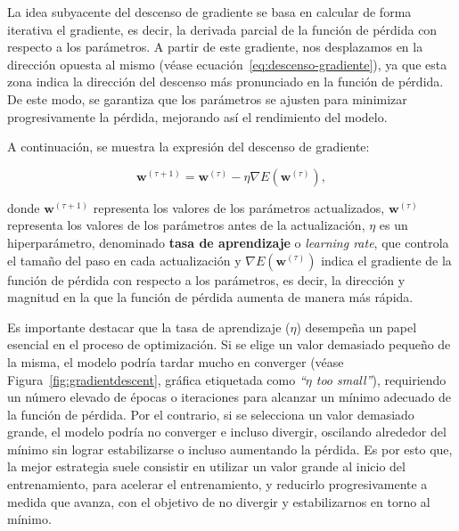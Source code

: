 La idea subyacente del descenso de gradiente se basa en calcular de forma iterativa el gradiente, es decir, la derivada parcial de la función de pérdida con respecto a los parámetros. A partir de este gradiente, nos desplazamos en la dirección opuesta al mismo (véase ecuación~\eqref{eq:descenso-gradiente}), ya que esta zona indica la dirección del descenso más pronunciado en la función de pérdida. De este modo, se garantiza que los parámetros se ajusten para minimizar progresivamente la pérdida, mejorando así el rendimiento del modelo.

A continuación, se muestra la expresión del descenso de gradiente:

\begin{equation}
    \mathbf{w}^{(\tau + 1)} = \mathbf{w}^{(\tau)} - \eta \nabla E(\mathbf{w}^{(\tau)}),
    \label{eq:descenso-gradiente}
\end{equation}

donde $\mathbf{w}^{(\tau + 1)}$ representa los valores de los parámetros actualizados, $\mathbf{w}^{(\tau)}$ representa los valores de los parámetros antes de la actualización, $\eta$ es un hiperparámetro, denominado \textbf{tasa de aprendizaje} o \emph{learning rate}, que controla el tamaño del paso en cada actualización y $\nabla E(\mathbf{w}^{(\tau)})$ indica el gradiente de la función de pérdida con respecto a los parámetros, es decir, la dirección y magnitud en la que la función de pérdida aumenta de manera más rápida.

Es importante destacar que la tasa de aprendizaje ($\eta$) desempeña un papel esencial en el proceso de optimización. Si se elige un valor demasiado pequeño de la misma, el modelo podría tardar mucho en converger (véase Figura~\ref{fig:gradientdescent}, gráfica etiquetada como \textit{``$\eta$ too small''}), requiriendo un número elevado de épocas o iteraciones para alcanzar un mínimo adecuado de la función de pérdida. Por el contrario, si se selecciona un valor demasiado grande, el modelo podría no converger e incluso divergir, oscilando alrededor del mínimo sin lograr estabilizarse o incluso aumentando la pérdida. Es por esto que, la mejor estrategia suele consistir en utilizar un valor grande al inicio del entrenamiento, para acelerar el entrenamiento, y reducirlo progresivamente a medida que avanza, con el objetivo de no divergir y estabilizarnos en torno al mínimo.

